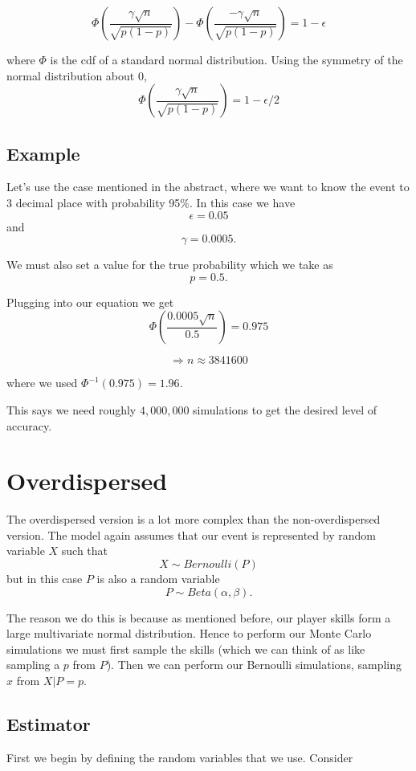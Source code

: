 \documentclass[
10pt, %
a4paper, %
oneside, %
headinclude,footinclude, %
BCOR5mm, %
]{scrartcl}
\begin{document}
$$ \Phi(\frac{\gamma \sqrt{n}}{\sqrt{p(1-p)}}) - \Phi(\frac{-\gamma \sqrt{n}}{\sqrt{p(1-p)}}) = 1 - \epsilon $$

where $\Phi$ is the cdf of a standard normal distribution. Using the symmetry of the normal distribution about $0$,
$$ \Phi(\frac{\gamma \sqrt{n}}{\sqrt{p(1-p)}}) = 1 - \epsilon/2 $$

\subsection{Example}
Let's use the case mentioned in the abstract, where we want to know the event to 3 decimal place with probability 95\%. In this case we have
$$ \epsilon = 0.05 $$
and
$$ \gamma = 0.0005. $$

We must also set a value for the true probability which we take as
$$ p = 0.5. $$

Plugging into our equation we get
$$ \Phi(\frac{0.0005 \sqrt{n}}{0.5}) = 0.975 $$

$$ \Rightarrow n \approx 3841600 $$

where we used $\Phi^{-1}(0.975) = 1.96$.

This says we need roughly $4,000,000$ simulations to get the desired level of accuracy.



\section{Overdispersed}
The overdispersed version is a lot more complex than the non-overdispersed version. The model again assumes that our event is represented by random variable $X$ such that
$$ X \sim Bernoulli(P) $$
but in this case $P$ is also a random variable
$$ P \sim Beta(\alpha, \beta). $$

The reason we do this is because as mentioned before, our player skills form a large multivariate normal distribution. Hence to perform our Monte Carlo simulations we must first sample the skills (which we can think of as like sampling a $p$ from $P$). Then we can perform our Bernoulli simulations, sampling $x$ from $X | P=p$.

\subsection{Estimator}
First we begin by defining the random variables that we use. Consider
\end{document}
